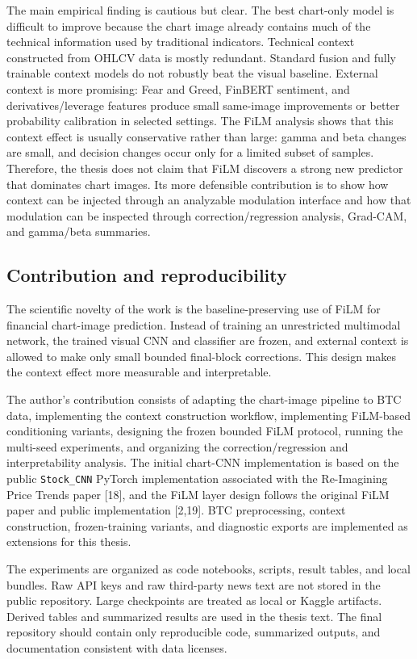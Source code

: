 \documentclass[14pt,a4paper]{extarticle}
\newcommand{\code}[1]{\texttt{#1}}
\begin{document}
The main empirical finding is cautious but clear. The best chart-only model is difficult to improve because the chart image already contains much of the technical information used by traditional indicators. Technical context constructed from OHLCV data is mostly redundant. Standard fusion and fully trainable context models do not robustly beat the visual baseline. External context is more promising: Fear and Greed, FinBERT sentiment, and derivatives/leverage features produce small same-image improvements or better probability calibration in selected settings. The FiLM analysis shows that this context effect is usually conservative rather than large: gamma and beta changes are small, and decision changes occur only for a limited subset of samples. Therefore, the thesis does not claim that FiLM discovers a strong new predictor that dominates chart images. Its more defensible contribution is to show how context can be injected through an analyzable modulation interface and how that modulation can be inspected through correction/regression analysis, Grad-CAM, and gamma/beta summaries.

\subsection{Contribution and reproducibility}

The scientific novelty of the work is the baseline-preserving use of FiLM for financial chart-image prediction. Instead of training an unrestricted multimodal network, the trained visual CNN and classifier are frozen, and external context is allowed to make only small bounded final-block corrections. This design makes the context effect more measurable and interpretable.

The author's contribution consists of adapting the chart-image pipeline to BTC data, implementing the context construction workflow, implementing FiLM-based conditioning variants, designing the frozen bounded FiLM protocol, running the multi-seed experiments, and organizing the correction/regression and interpretability analysis. The initial chart-CNN implementation is based on the public \code{Stock\_CNN} PyTorch implementation associated with the Re-Imagining Price Trends paper [18], and the FiLM layer design follows the original FiLM paper and public implementation [2,19]. BTC preprocessing, context construction, frozen-training variants, and diagnostic exports are implemented as extensions for this thesis.

The experiments are organized as code notebooks, scripts, result tables, and local bundles. Raw API keys and raw third-party news text are not stored in the public repository. Large checkpoints are treated as local or Kaggle artifacts. Derived tables and summarized results are used in the thesis text. The final repository should contain only reproducible code, summarized outputs, and documentation consistent with data licenses.
\end{document}
